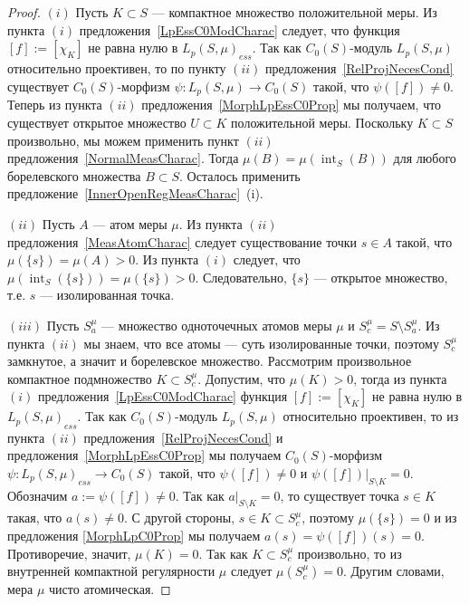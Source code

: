 \documentclass[12pt]{article}
\begin{document}
\begin{proof} $(i)$ Пусть $K\subset S$ --- компактное множество положительной
    меры. Из пункта $(i)$ предложения~\ref{LpEssC0ModCharac} следует, что
    функция $[f]:=[\chi_K]$ не равна нулю в ${L_p(S,\mu)}_{ess}$. Так как
    $C_0(S)$-модуль $L_p(S,\mu)$ относительно проективен, то по пункту $(ii)$
    предложения~\ref{RelProjNecesCond} существует $C_0(S)$-морфизм
    $\psi:L_p(S,\mu)\to C_0(S)$ такой, что $\psi([f])\neq 0$. Теперь из пункта
    $(ii)$ предложения~\ref{MorphLpEssC0Prop} мы получаем, что существует
    открытое множество $U\subset K$ положительной меры. Поскольку $K\subset S$
    произвольно, мы можем применить пункт $(ii)$
    предложения~\ref{NormalMeasCharac}. Тогда
    $\mu(B)=\mu(\operatorname{int}_S(B))$ для любого борелевского множества
    $B\subset S$. Осталось применить 
    предложение~\ref{InnerOpenRegMeasCharac}~(i).

    $(ii)$ Пусть $A$ --- атом меры $\mu$. Из пункта $(ii)$
    предложения~\ref{MeasAtomCharac} следует существование точки $s\in A$ такой,
    что $\mu(\{s\})=\mu(A)>0$. Из пункта $(i)$ следует, что
    $\mu(\operatorname{int}_S(\{s\}))=\mu(\{s\})>0$. Следовательно, $\{s\}$ ---
    открытое множество, т.е. $s$ --- изолированная точка.

    $(iii)$ Пусть $S_a^\mu$ --- множество одноточечных атомов меры $\mu$ и
    $S_c^\mu=S\setminus S_a^\mu$. Из пункта $(ii)$ мы знаем, что все атомы ---
    суть изолированные точки, поэтому $S_c^\mu$ замкнутое, а значит и
    борелевское множество. Рассмотрим произвольное компактное подмножество
    $K\subset S_c^\mu$. Допустим, что $\mu(K)>0$, тогда из пункта $(i)$
    предложения~\ref{LpEssC0ModCharac} функция $[f]:=[\chi_K]$ не равна нулю в
    ${L_p(S,\mu)}_{ess}$. Так как $C_0(S)$-модуль $L_p(S, \mu)$ относительно
    проективен, то из пункта $(ii)$ предложения~\ref{RelProjNecesCond} и
    предложения~\ref{MorphLpEssC0Prop} мы получаем $C_0(S)$-морфизм
    $\psi:{L_p(S,\mu)}_{ess}\to C_0(S)$ такой, что $\psi([f])\neq 0$ и
    $\psi([f])|_{S\setminus K}=0$. Обозначим $a:=\psi([f])\neq 0$. Так как
    $a|_{S\setminus K}=0$, то существует точка $s\in K$ такая, что $a(s)\neq 0$.
    С другой стороны, $s\in K\subset S_c^{\mu}$, поэтому $\mu(\{s\})=0$ и из 
    предложения \ref{MorphLpC0Prop} мы получаем $a(s)=\psi([f])(s)=0$. 
    Противоречие, значит, $\mu(K)=0$. Так как $K\subset S_c^\mu$
    произвольно, то из внутренней компактной регулярности $\mu$ следует
    $\mu(S_c^\mu)=0$. Другим словами, мера $\mu$ чисто атомическая.
\end{proof}
\end{document}
